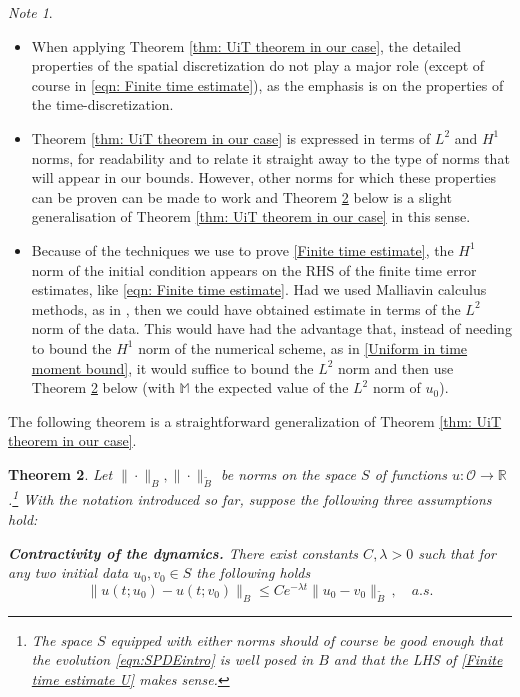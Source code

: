 \documentclass[reqno, 11pt]{amsart}
\theoremstyle{plain}
\newtheorem{theorem}{Theorem}[section]
\theoremstyle{definition}
\theoremstyle{remark}
\newtheorem{note}[theorem]{Note}
\numberwithin{equation}{section}
\numberwithin{theorem}{section}
\newcommand{\R}{\mathbb{R}}
\begin{document}
{\begin{note}
\begin{itemize}
\item When applying Theorem \ref{thm: UiT theorem in our case}, the detailed properties of the spatial discretization do not play a major role (except of course in \eqref{eqn: Finite time estimate}),  as the emphasis is on the properties of the time-discretization. 


\item Theorem \ref{thm: UiT theorem in our case} is expressed in terms of  $L^2$ and $H^1$ norms, for readability and to relate it straight away to the type of norms that will appear in our bounds.  However, other norms for which these properties can be proven can be made to work and Theorem \ref{thm: more general UiT theorem} below is a slight generalisation of Theorem \ref{thm: UiT theorem in our case} in this sense. 

\item Because of the techniques we use to prove \ref{Finite time estimate}, the $H^1$ norm of the initial condition appears on the RHS of the finite time error estimates, like \eqref{eqn: Finite time estimate}. Had we used Malliavin calculus methods, as in \cite{cui2019strong}, then we could have obtained estimate in terms of the $L^2$ norm of the data. This would have had  the advantage that, instead of needing to bound the $H^1$ norm of the numerical scheme, as in \ref{Uniform in time moment bound}, it would suffice to bound the  $L^2$ norm and then use Theorem \ref{thm: more general UiT theorem} below (with $\mathbb M$ the expected value of the $L^2$ norm of $u_0$).  \end{itemize}
\end{note}
The following theorem is a straightforward generalization of Theorem \ref{thm: UiT theorem in our case}. 



\begin{theorem}\label{thm: more general UiT theorem}
    Let $\| \cdot\|_B, \| \cdot\|_{\tilde B}$  be  norms  on the space $S$ of functions $u: \mathcal O \rightarrow \R$.\footnote{The space $S$ equipped with either norms should of course be good enough that the evolution \eqref{eqn:SPDEintro} is well posed in $B$ and that the LHS of \ref{Finite time estimate U} makes sense. } With  the notation introduced so far, suppose the following three assumptions hold:
    
    \begin{enumerate}[label=\textnormal{[A\arabic*]},ref={[A\arabic*]}]

\item\label{Contractivity of SPDE U}{\bf Contractivity of the dynamics.} There exist constants  $C, \lambda>0$ such that for any two initial data $u_0, v_0 \in S$  the following holds
\begin{equation}\label{eqn:contractivity norm B}
    \|u(t;u_0) - u(t;v_0)\|_{B} \leq C e^{-\lambda t} \|u_0 - v_0 \|_{\tilde B} \,, \quad a.s. 
\end{equation}


\end{enumerate}
\end{theorem}}
\end{document}
